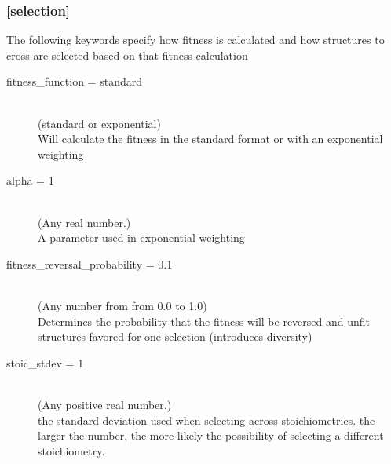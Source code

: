 \subsubsection{[selection]}
		The following keywords specify how fitness is calculated and how structures to cross are selected based on that fitness calculation
\begin{description}		
		\item[fitness\_function = standard]~\\
			(standard or exponential)\\
			Will calculate the fitness in the standard format or with an exponential weighting
		\item[alpha = 1]~\\
			(Any real number.)\\
			A parameter used in exponential weighting
		\item[fitness\_reversal\_probability = 0.1]~\\
			(Any number from from 0.0 to 1.0)\\
			Determines the probability that the fitness will be reversed and unfit structures favored for one selection (introduces diversity)
		\item[stoic\_stdev = 1]~\\
			(Any positive real number.)\\
			the standard deviation used when selecting across stoichiometries. the larger the number, the more likely the possibility of selecting a different stoichiometry.
\end{description}

